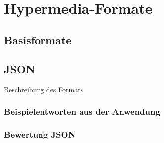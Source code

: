 \newpage
\section{Hypermedia-Formate}

\subsection{Basisformate}


\subsection{JSON}
Beschreibung des Formats

\subsubsection{Beispielentworten aus der Anwendung}

\subsubsection{Bewertung JSON}


